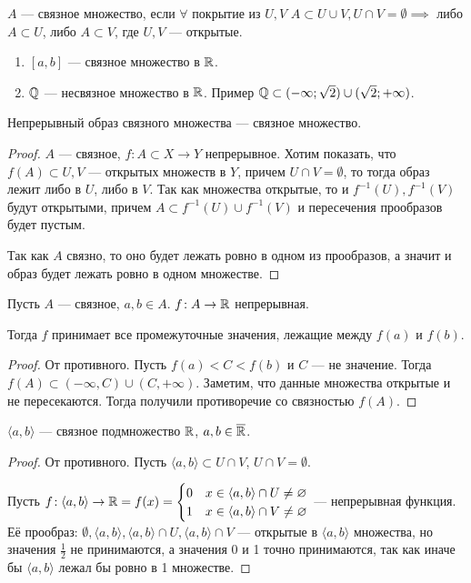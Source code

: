 \begin{definition}
    $A$ --- связное множество, если  $\forall$ покрытие из $U, V$  $A \subset U \cup V, U \cap V = \emptyset \implies $ либо  $A \subset U$, либо  $A \subset V$, где $U, V$ --- открытые.
\end{definition}
\begin{example}
    \begin{enumerate}
        \item $[a, b]$ --- связное множество в  $\mathbb{R}$.
        \item  $\mathbb{Q}$ --- несвязное множество в  $\mathbb{R}$. Пример  $\mathbb{Q} \subset (-\infty; \sqrt{2}) \cup (\sqrt{2}; +\infty)$.
    \end{enumerate}
\end{example}
\begin{theorem}
    Непрерывный образ связного множества --- связное множество.
\end{theorem}
\begin{proof}
    $A$ --- связное,  $f\!: A \subset X \to Y$ непрерывное. Хотим показать, что $f(A) \subset U, V$ --- открытых множеств в $Y$, причем  $U \cap V = \emptyset$, то тогда образ лежит либо в $U$, либо в  $V$. Так как множества открытые, то и $f^{-1}(U), f^{-1}(V)$ будут открытыми, причем  $A \subset f^{-1}(U) \cup f^{-1}(V)$ и пересечения прообразов будет пустым.

    Так как $A$ связно, то оно будет лежать ровно в одном из прообразов, а значит и образ будет лежать ровно в одном множестве.
\end{proof}
\begin{consequence}
    Пусть $A$ --- связное, $a, b \in A$. $f\!: A \to \mathbb{R}$ непрерывная. 

    Тогда  $f$ принимает все промежуточные значения, лежащие между  $f(a)$ и  $f(b)$.
\end{consequence}
\begin{proof}
    От противного. Пусть $f(a) < C < f(b)$ и $C$ --- не значение. Тогда  $f(A) \subset (-\infty, C) \cup (C, +\infty)$. Заметим, что данные множества открытые и не пересекаются. Тогда получили противоречие со связностью  $f(A)$.
\end{proof}
\begin{theorem}
    $\langle a, b \rangle$ --- связное подмножество  $\mathbb{R}$,  $a, b \in \overline{\mathbb{R}}$.
\end{theorem}
\begin{proof}
    От противного. Пусть $\langle a, b \rangle \subset U \cap V$,  $U \cap V = \emptyset$. 

    Пусть  $f\!: \langle a, b \rangle \to \mathbb{R} = f(x) = \begin{cases} 0 & x \in \langle a, b \rangle \cap U \neq \varnothing \\ 1 & x \in \langle a, b \rangle \cap V \neq \varnothing \end{cases}$ --- непрерывная функция. Её прообраз:  $\emptyset, \langle a, b \rangle, \langle a, b \rangle \cap U, \langle a, b \rangle \cap V$ --- открытые в  $\langle a, b \rangle$ множества, но значения  $\frac{1}{2}$ не принимаются, а значения 0 и 1 точно принимаются, так как иначе бы $\langle a, b \rangle$ лежал бы ровно в 1 множестве. 
\end{proof}

